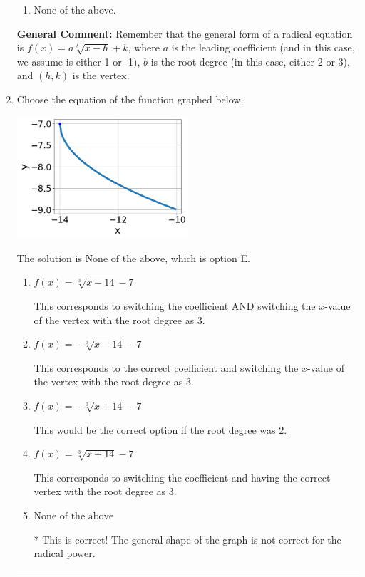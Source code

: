 \documentclass{extbook}[14pt]
\newcommand{\litem}[1]{\item #1

\rule{\textwidth}{0.4pt}}
\begin{document}
\begin{enumerate}
{\begin{enumerate}[label=\Alph*.]
\begin{multicols}{2}
\end{multicols}\item None of the above.\end{enumerate}
\textbf{General Comment:} Remember that the general form of a radical equation is $ f(x) = a \sqrt[b]{x - h} + k $, where $a$ is the leading coefficient (and in this case, we assume is either 1 or -1), $b$ is the root degree (in this case, either 2 or 3), and $(h, k)$ is the vertex.
}
\litem{
Choose the equation of the function graphed below.

\begin{center}
    \includegraphics[width=0.5\textwidth]{../Figures/radicalGraphToEquationC.png}
\end{center}


The solution is \( \text{None of the above} \), which is option E.\begin{enumerate}[label=\Alph*.]
\item \( f(x) = \sqrt[3]{x - 14} - 7 \)

This corresponds to switching the coefficient AND switching the $x$-value of the vertex with the root degree as $3$.
\item \( f(x) = - \sqrt[3]{x - 14} - 7 \)

This corresponds to the correct coefficient and switching the $x$-value of the vertex with the root degree as $3$.
\item \( f(x) = - \sqrt[3]{x + 14} - 7 \)

This would be the correct option if the root degree was $2$.
\item \( f(x) = \sqrt[3]{x + 14} - 7 \)

This corresponds to switching the coefficient and having the correct vertex with the root degree as $3$.
\item \( \text{None of the above} \)

* This is correct! The general shape of the graph is not correct for the radical power.
\end{enumerate}

}
\end{enumerate}
\end{document}
